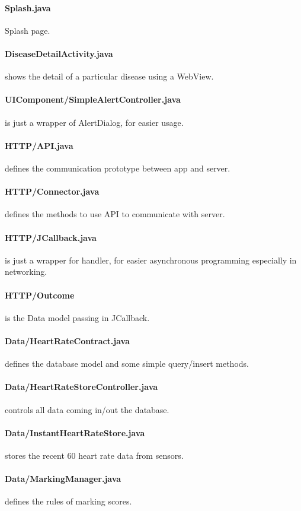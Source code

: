 \paragraph{Splash.java} Splash page.
\paragraph{DiseaseDetailActivity.java} shows the detail of a particular disease using a WebView.
\paragraph{UIComponent/SimpleAlertController.java} is just a wrapper of AlertDialog, for easier usage.
\paragraph{HTTP/API.java} defines the communication prototype between app and server.
\paragraph{HTTP/Connector.java} defines the methods to use API to communicate with server.
\paragraph{HTTP/JCallback.java} is just a wrapper for handler, for easier asynchronous programming especially in networking.
\paragraph{HTTP/Outcome} is the Data model passing in JCallback.
\paragraph{Data/HeartRateContract.java} defines the database model and some simple query/insert methods.
\paragraph{Data/HeartRateStoreController.java} controls all data coming in/out the database.
\paragraph{Data/InstantHeartRateStore.java} stores the recent 60 heart rate data from sensors.
\paragraph{Data/MarkingManager.java} defines the rules of marking scores.
